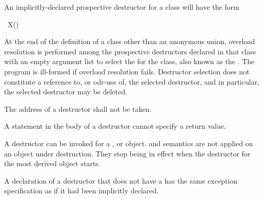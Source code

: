 \pnum
An implicitly-declared prospective destructor for a class  will have the form
\begin{codeblock}
~X()
\end{codeblock}

\pnum
At the end of the definition of a class
other than an anonymous union,
overload resolution is performed
among the prospective destructors declared in that class
with an empty argument list
to select the  for the class,
also known as the .
The program is ill-formed if overload resolution fails.
Destructor selection does not constitute
a reference to,
or odr-use of,
the selected destructor,
and in particular,
the selected destructor may be deleted.

\pnum
{}%
The address of a destructor shall not be taken.
%
\begin{note}
A  statement in the body of a destructor
cannot specify a return value.
\end{note}
%
%
A destructor can be invoked for a
,
or
object.
and
semantics are not applied on an object under destruction.
They stop being in effect when the destructor for the
most derived object starts.

\pnum
\begin{note}
A declaration of a destructor that does not have a 
has the same exception specification as if it had been implicitly declared.
\end{note}

